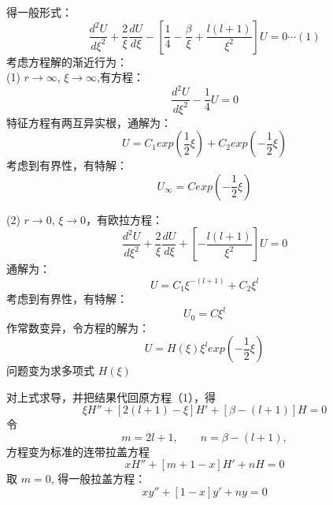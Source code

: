 	得一般形式：
	\begin{equation*}
		\frac{d^2 U}{d \xi ^2} + \frac{2}{\xi }\frac{d U }{d \xi}  -[ \frac{1} {4}  -\frac{\beta}{\xi} + \frac{l(l+1)}{\xi ^2}] U=0  \cdots (1)
	\end{equation*}	 
	考虑方程解的渐近行为： \\
	(1) $r\to \infty$, $\xi \to \infty$,有方程：
	\begin{equation*}
		\frac{d^2 U}{d \xi ^2}   - \frac{1} {4}  U=0
	\end{equation*}	
	特征方程有两互异实根，通解为：
	\begin{equation*}
		U=C_1 exp(\frac{1}{2}\xi ) +C_2 exp(-\frac{1}{2}\xi ) 
	\end{equation*}	
	考虑到有界性，有特解：
	\begin{equation*}
		U_\infty  =  C  exp(-\frac{1}{2}\xi ) 
	\end{equation*}	
	


	(2) $r\to 0$, $\xi \to 0$，有欧拉方程：
	\begin{equation*}
		\frac{d^2 U}{d \xi ^2} + \frac{2}{\xi }\frac{d U }{d \xi}  +[ - \frac{l(l+1)}{\xi ^2}] U=0
	\end{equation*}	 
	通解为：
	\begin{equation*}
		U=C_1 \xi ^{-(l+1)}+C_2 \xi ^ l 
	\end{equation*}	
	考虑到有界性，有特解：
	\begin{equation*}
		U_0=C  \xi ^ l 
	\end{equation*}	
	作常数变异，令方程的解为：
	\begin{equation*}
		U=H(\xi)  \xi ^ l  exp(-\frac{1}{2}\xi ) 
	\end{equation*}	
	问题变为求多项式 $H(\xi)$
	


	对上式求导，并把结果代回原方程（1），得
	\begin{equation*}
		\xi H''  + [2(l+1) -\xi] H' +[\beta -(l+1)] H =0
	\end{equation*}	
	令
	\begin{equation*}
		m=2l+1, \qquad n=\beta-(l+1), 
	\end{equation*}	
	方程变为标准的连带拉盖方程
	\begin{equation*}
		\boxed{x H''  + [m+1 -x] H' +n H =0}
	\end{equation*}	
	取 $m=0$, 得一般拉盖方程：
	\begin{equation*}
		\boxed{x y''  + [1 -x] y' +n y =0}
	\end{equation*}	
	

